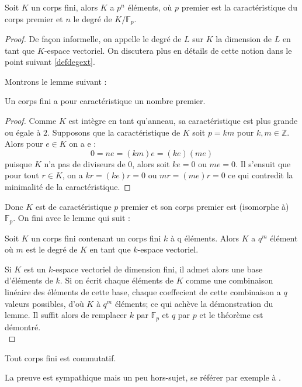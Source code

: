 \documentclass[a4paper]{article} %
\numberwithin{equation}{section}
\newcommand\GF[1]{\mathbb{F}_{#1}}
\begin{document}
\begin{thm}
\label{corfincarprem}
Soit $K$ un corps fini, alors $K$ a $p^n$ éléments, où $p$ premier est la
caractéristique du corps premier et $n$ le degré de $K/\GF{p}$.
\end{thm}
\begin{proof}
De façon informelle, on appelle le degré de $L$ sur $K$ la dimension de $L$
en tant que $K$-espace vectoriel. On discutera plus en détails de cette
notion dans le point suivant \ref{defdegext}.\par
Montrons le lemme suivant :
\begin{lem}
Un corps fini a pour caractéristique un nombre premier.
\end{lem}
\begin{proof}
Comme $K$ est intègre en tant qu'anneau, sa caractéristique est plus grande ou
égale à $2$. Supposons que la caractéristique de $K$ soit $p = km$ pour $k,
m\in\mathbb{Z}$. Alors pour $e\in K$ on a e :
\[0 = ne = (km)e = (ke)(me)\]
puisque $K$ n'a pas de diviseurs de $0$, alors soit $ke = 0$ ou $me = 0$. Il
s'ensuit que pour tout $r\in K$, on a $kr = (ke)r = 0$ ou $mr = (me)r = 0$ ce
qui contredit la minimalité de la caractéristique.
\end{proof}
Donc $K$ est de caractéristique $p$ premier et son corps premier est (isomorphe
à) $\GF{p}$. On fini avec le lemme qui suit :
\begin{lem}
Soit $K$ un corps fini contenant un corps fini $k$ à q éléments. Alors $K$ a
$q^m$ élément où $m$ est le degré de $K$ en tant que $k$-espace vectoriel.
\end{lem}
Si $K$ est un $k$-espace vectoriel de dimension fini, il admet alors une base
d'éléments de $k$. Si on écrit chaque éléments de $K$ comme une combinaison
linéaire des éléments de cette base, chaque coeffecient de cette combinaison a
$q$ valeurs possibles, d'où $K$ à $q^m$ éléments; ce qui achève la démonstration
du lemme. Il suffit alors de remplacer $k$ par $\GF{p}$ et $q$ par $p$ et le
théorème est démontré.\\
\end{proof}

\begin{thm}[Wedderburn]
Tout corps fini est commutatif.
\end{thm}
La preuve est sympathique mais un peu hors-sujet, se référer par exemple à 
\cite[p.~70-73]{LiNi}.\\\par
\end{document}
